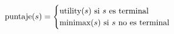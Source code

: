 \documentclass[preview]{standalone}
\begin{document}
\begin{align*}
\text{puntaje($s$)} =  \begin{cases}\text{utility($s$) si $s$ es terminal} \cr
                                 \text{minimax($s$) si $s$ no es terminal} \cr
                                 \end{cases}
\end{align*}
\end{document}
